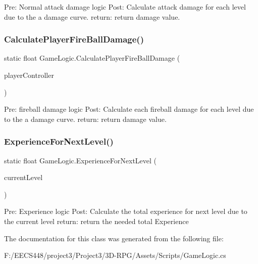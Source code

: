 Pre\+: Normal attack damage logic Post\+: Calculate attack damage for each level due to the a damage curve. return\+: return damage value. \mbox{\label{class_game_logic_a46f0fff3a959896924ec24700c8f966f}} 
\subsubsection{\texorpdfstring{Calculate\+Player\+Fire\+Ball\+Damage()}{CalculatePlayerFireBallDamage()}}
{\footnotesize\ttfamily static float Game\+Logic.\+Calculate\+Player\+Fire\+Ball\+Damage (\begin{DoxyParamCaption}\item[{\hyperlink{class_player_controller}{Player\+Controller}}]{player\+Controller }\end{DoxyParamCaption})\hspace{0.3cm}{\ttfamily [static]}}

Pre\+: fireball damage logic Post\+: Calculate each fireball damage for each level due to the a damage curve. return\+: return damage value. \mbox{\label{class_game_logic_a7ef74366346ed65630395fb9bf33c7f9}} 
\subsubsection{\texorpdfstring{Experience\+For\+Next\+Level()}{ExperienceForNextLevel()}}
{\footnotesize\ttfamily static float Game\+Logic.\+Experience\+For\+Next\+Level (\begin{DoxyParamCaption}\item[{int}]{current\+Level }\end{DoxyParamCaption})\hspace{0.3cm}{\ttfamily [static]}}

Pre\+: Experience logic Post\+: Calculate the total experience for next level due to the current level return\+: return the needed total Experience 

The documentation for this class was generated from the following file\+:\begin{DoxyCompactItemize}
\item 
F\+:/\+E\+E\+C\+S448/project3/\+Project3/3\+D-\/\+R\+P\+G/\+Assets/\+Scripts/Game\+Logic.\+cs\end{DoxyCompactItemize}
